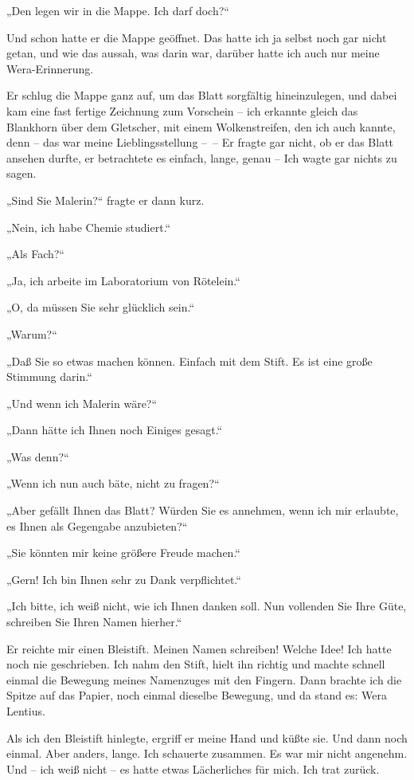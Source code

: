 „Den legen wir in die Mappe. Ich darf doch?“

Und schon hatte er die Mappe geöffnet. Das hatte ich ja selbst noch
gar nicht getan, und wie das aussah, was darin war, darüber hatte
ich auch nur meine Wera-Erinnerung.

Er schlug die Mappe ganz auf, um das Blatt sorgfältig
hineinzulegen, und dabei kam eine fast fertige Zeichnung zum
Vorschein – ich erkannte gleich das Blankhorn über dem Gletscher,
mit einem Wolkenstreifen, den ich auch kannte, denn – das war meine
Lieblingsstellung –~– Er fragte gar nicht, ob er das Blatt ansehen
durfte, er betrachtete es einfach, lange, genau – Ich wagte gar
nichts zu sagen.

„Sind Sie Malerin?“ fragte er dann kurz.

„Nein, ich habe Chemie studiert.“

„Als Fach?“

„Ja, ich arbeite im Laboratorium von Rötelein.“

„O, da müssen Sie sehr glücklich sein.“

„Warum?“

„Daß Sie so etwas machen können. Einfach mit dem Stift. Es ist eine
große Stimmung darin.“

„Und wenn ich Malerin wäre?“

„Dann hätte ich Ihnen noch Einiges gesagt.“

„Was denn?“

„Wenn ich nun auch bäte, nicht zu fragen?“

„Aber gefällt Ihnen das Blatt? Würden Sie es annehmen, wenn ich mir
erlaubte, es Ihnen als Gegengabe anzubieten?“

„Sie könnten mir keine größere Freude machen.“

„Gern! Ich bin Ihnen sehr zu Dank verpflichtet.“

„Ich bitte, ich weiß nicht, wie ich Ihnen danken soll. Nun
vollenden Sie Ihre Güte, schreiben Sie Ihren Namen hierher.“

Er reichte mir einen Bleistift. Meinen Namen schreiben! Welche
Idee! Ich hatte noch nie geschrieben. Ich nahm den Stift, hielt ihn
richtig und machte schnell einmal die Bewegung meines Namenzuges
mit den Fingern. Dann brachte ich die Spitze auf das Papier, noch
einmal dieselbe Bewegung, und da stand es: Wera Lentius.

Als ich den Bleistift hinlegte, ergriff er meine Hand und küßte
sie. Und dann noch einmal. Aber anders, lange. Ich schauerte
zusammen. Es war mir nicht angenehm. Und – ich weiß nicht – es
hatte etwas Lächerliches für mich. Ich trat zurück.

